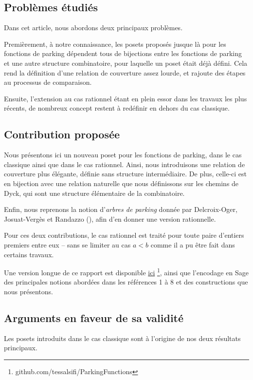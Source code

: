 \documentclass[11pt]{article}
\begin{document}
\subsection*{Problèmes étudiés}

Dans cet article, nous abordons deux principaux problèmes.

Premièrement, à notre connaissance, les posets proposés jusque là pour
les fonctions de parking dépendent tous de bijections entre les fonctions
de parking et une autre structure combinatoire, pour laquelle un poset
était déjà défini. Cela rend la définition d'une relation de couverture
assez lourde, et rajoute des étapes au processus de comparaison.

Ensuite, l'extension au cas rationnel étant en plein essor dans les travaux
les plus récents, de nombreux concept restent à redéfinir en dehors du cas
classique.

\subsection*{Contribution proposée}
Nous présentons ici un nouveau poset pour les fonctions de
parking, dans le cas classique ainsi que dans le cas rationnel.
Ainsi, nous introduisons une relation de couverture plus élégante,
définie sans structure intermédiaire.
De plus, celle-ci est en bijection avec une relation naturelle que nous
définissons sur les chemins de Dyck, qui sont une structure élémentaire
de la combinatoire.

Enfin, nous reprenons la notion d'\emph{arbres de parking} donnée par
Delcroix-Oger, Josuat-Vergès et Randazzo (\cite{ref9}), afin d'en donner
une version rationnelle.

Pour ces deux contributions, le cas rationnel est traité pour toute paire
d'entiers premiers entre eux -- sans se limiter au cas $a < b$ comme il a
pu être fait dans certains travaux.

Une version longue de ce rapport est disponible 
\href{https://github.com/tessalsifi/ParkingFunctions}{ici}
\footnote{github.com/tessalsifi/ParkingFunctions}, ainsi que l'encodage
en Sage des principales notions abordées dans les références 1 à 8 et des
constructions que nous présentons.

\subsection*{Arguments en faveur de sa validité}
Les posets introduits dans le cas classique sont à l'origine de nos
deux résultats principaux.
\end{document}
